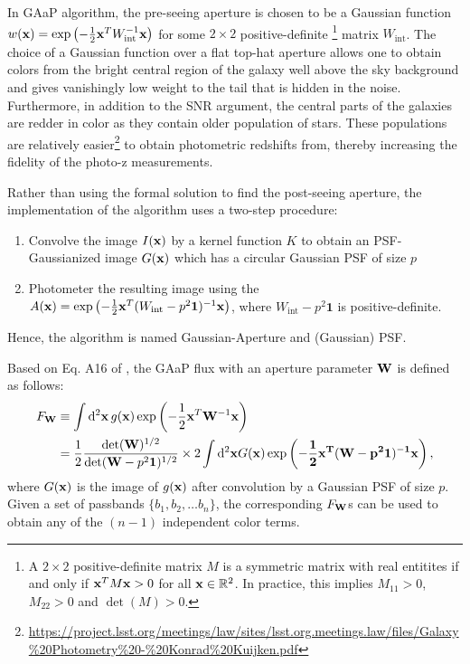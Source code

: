\documentclass[DM,lsstdraft, authoryear,toc]{lsstdoc}
\newcommand{\rmd}{\mathrm{d}^2}
\begin{document}
In GAaP algorithm, the pre-seeing aperture is chosen to be a Gaussian function $w({\bf x}) = \exp\left(-\frac{1}{2}{\bf x}^T W_\text{int}^{-1}{\bf x}\right)$ for some $2\times 2$ positive-definite
\footnote{A $2\times 2$ positive-definite matrix $M$ is a symmetric matrix with real entitites if and only if ${\bf x}^T M {\bf x} > 0$ for all ${\bf x} \in \mathbb{R}^2$. In practice, this implies $M_{11} >0$, $M_{22}>0$ and $\det(M)>0$.}
matrix $W_\text{int}$.
The choice of a Gaussian function over a flat top-hat aperture allows one to obtain colors from the bright central region of the galaxy well above the sky background and gives vanishingly low weight to the tail that is hidden in the noise.
Furthermore, in addition to the SNR argument, the central parts of the galaxies are redder in color as they contain older population of stars.
These populations are relatively easier\footnote{\tiny\url{https://project.lsst.org/meetings/law/sites/lsst.org.meetings.law/files/Galaxy\%20Photometry\%20-\%20Konrad\%20Kuijken.pdf}} to obtain photometric redshifts from, thereby increasing the fidelity of the photo-z measurements.

Rather than using the formal solution to find the post-seeing aperture, the implementation of the algorithm uses a two-step procedure:
\begin{enumerate}
  \item Convolve the image $I({\bf x})$ by a kernel function $K$ to obtain an PSF-Gaussianized image $G({\bf x})$ which has a circular Gaussian PSF of size $p$
  \item Photometer the resulting image using the $A({\bf x}) = \exp\left(-\frac{1}{2}{\bf x}^T(W_\text{int}-p^2\mathbf{1})^{-1}{\bf x} \right)$, where $W_\text{int}-p^2\mathbf{1}$ is positive-definite.
\end{enumerate}

Hence, the algorithm is named Gaussian-Aperture and (Gaussian) PSF.

Based on Eq. A16 of \cite{2015MNRAS.454.3500K}, the GAaP flux with an aperture parameter ${\bf W}$ is defined as follows:
\begin{align}
  F_{\bf W} &\equiv \int\rmd{\bf x}\, g({\bf x})\exp\left( -\frac{1}{2}{\bf x}^T{\bf W}^{-1}{\bf x} \right) \\
        &= \frac{1}{2}\frac{\det({\bf W})^{1/2}}{\det({\bf W}-p^2{\bf 1})^{1/2}}\times 2\int\rmd{\bf x} G(\bf x) \exp\left(-\frac{1}{2}{\bf x}^T({\bf W}-p^2{\bf 1})^{-1}{\bf x}\right),
  \label{eq:A16}
\end{align}
where $G({\bf x})$ is the image of $g({\bf x})$ after convolution by a Gaussian PSF of size $p$.
Given a set of passbands $\{b_1, b_2, \dots b_n \}$, the corresponding $F_{\bf W}$s can be used to obtain any of the $(n-1)$ independent color terms.
\end{document}
